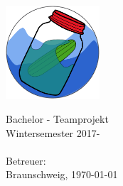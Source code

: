 \begin{titlepage}
\begin{center}
{}\\[5ex]

\includegraphics[width=3.5cm]{common/Logo.eps}\setlength{\unitlength}{1mm}

Bachelor - Teamprojekt\\
Wintersemester 2017-\the\year\\[6ex]

{}\\[5ex]

Betreuer: \betreuer\\[5ex]



\vfill
Braunschweig, \today

\end{center}
\end{titlepage}
